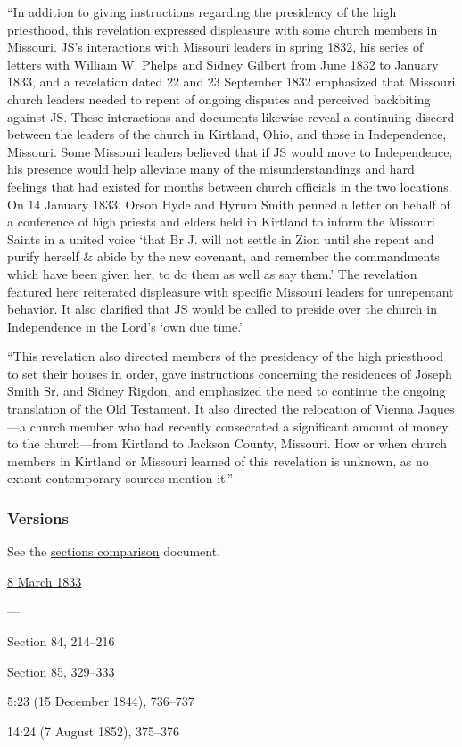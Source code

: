 			``In addition to giving instructions regarding the presidency of the high priesthood, this revelation expressed displeasure with some church members in Missouri. JS's interactions with Missouri leaders in spring 1832, his series of letters with William W. Phelps and Sidney Gilbert from June 1832 to January 1833, and a revelation dated 22 and 23 September 1832 emphasized that Missouri church leaders needed to repent of ongoing disputes and perceived backbiting against JS. These interactions and documents likewise reveal a continuing discord between the leaders of the church in Kirtland, Ohio, and those in Independence, Missouri. Some Missouri leaders believed that if JS would move to Independence, his presence would help alleviate many of the misunderstandings and hard feelings that had existed for months between church officials in the two locations. On 14 January 1833, Orson Hyde and Hyrum Smith penned a letter on behalf of a conference of high priests and elders held in Kirtland to inform the Missouri Saints in a united voice `that Br J. will not settle in Zion until she repent and purify herself \& abide by the new covenant, and remember the commandments which have been given her, to do them as well as say them.' The revelation featured here reiterated displeasure with specific Missouri leaders for unrepentant behavior. It also clarified that JS would be called to preside over the church in Independence in the Lord's `own due time.'
			
			``This revelation also directed members of the presidency of the high priesthood to set their houses in order, gave instructions concerning the residences of Joseph Smith Sr. and Sidney Rigdon, and emphasized the need to continue the ongoing translation of the Old Testament. It also directed the relocation of Vienna Jaques---a church member who had recently consecrated a significant amount of money to the church---from Kirtland to Jackson County, Missouri. How or when church members in Kirtland or Missouri learned of this revelation is unknown, as no extant contemporary sources mention it.''
			
	\subsubsection{Versions}
		\label{DC90-V}
		
		See the \href{https://drive.google.com/file/d/1goAvNz8jS4R8slYfMG_db55Ty2z_vmgK/view?usp=sharing}{sections comparison} document.
	
		\begin{compactdesc}
			\item[JSP] \hyperref[EMS-1833-JS-8-MAR-1833]{8 March 1833}
			\item[BC] ---
			\item[DC 1835] Section 84, 214--216
			\item[DC 1844] Section 85, 329--333
			\item[TS] 5:23 (15 December 1844), 736--737
			\item[MS] 14:24 (7 August 1852), 375--376
		\end{compactdesc}

